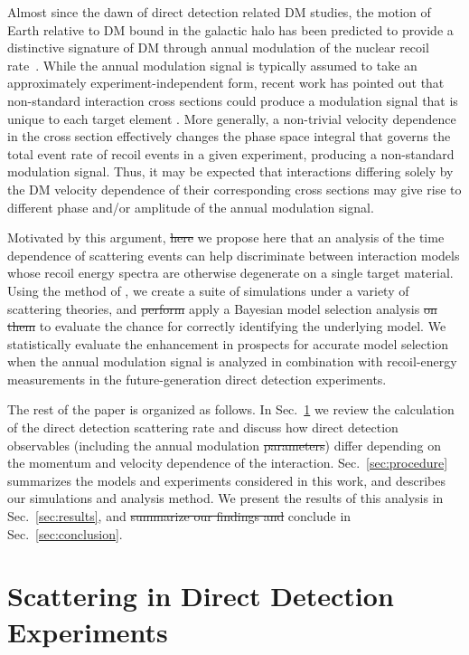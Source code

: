 \documentclass[11pt]{article}
\newcommand{\Sec}[1]{Sec.~\ref{#1}} \newcommand{\Secs}[2]{Secs.~\ref{#1} and \ref{#2}} \newcommand{\Secm}[2]{Secs.~\ref{#1} through \ref{#2}}
\newcommand{\sjwColor}{red}
\newcommand{\sjw}[1]{{\color{\sjwColor} #1}}
\newcommand{\sjwrm}[1]{{\color{\sjwColor}\protect\sout{#1}}}
\begin{document}
Almost since the dawn of direct detection related DM studies, the motion of Earth relative to DM bound in the galactic halo has been predicted to provide a distinctive signature of DM through annual modulation of the nuclear recoil rate~\cite{Freese:1987wu, Freese:2012xd,Lee:2013xxa,Britto:2014wga,DelNobile:2015nua,Kouvaris:2015xga}. While the annual modulation signal is typically assumed to take an approximately experiment-independent form, recent work has pointed out that non-standard interaction cross sections could produce a modulation signal that is unique to each target element \cite{DelNobile:2015tza,DelNobile:2015rmp}. More generally, a non-trivial velocity dependence in the cross section effectively changes the phase space integral that governs the total event rate of recoil events in a given experiment, producing a non-standard modulation signal. Thus, it may be expected that interactions differing solely by the DM velocity dependence of their corresponding cross sections may give rise to different phase and/or amplitude of the annual modulation signal. 

Motivated by this argument, \sjwrm{here} we propose \sjw{here} that \sjw{an} analysis of \sjw{the} time dependence of scattering events can help discriminate between interaction models whose recoil energy spectra are otherwise degenerate on a single target material. Using the method of \cite{Gluscevic:2015sqa}, we create a suite of simulations under a variety of scattering theories, and \sjwrm{perform} \sjw{apply a} Bayesian model selection analysis \sjwrm{on them} to evaluate the chance for correctly identifying the underlying model. We statistically evaluate the enhancement in prospects for accurate model selection when the annual modulation signal is analyzed in combination with recoil-energy measurements in the future-generation direct detection experiments. 

The rest of the paper is organized as follows. In \Sec{sec:dd} we review the calculation of the direct detection scattering rate and discuss how direct detection observables (including the annual modulation \sjwrm{parameters}) differ depending on the momentum and velocity dependence of the interaction. \Sec{sec:procedure} summarizes the models and experiments considered in this work, and describes our simulations and analysis method. We present the results of this analysis in \Sec{sec:results}, and \sjwrm{summarize our findings and} conclude in \Sec{sec:conclusion}.

\section{Scattering in Direct Detection Experiments}\label{sec:dd}
\end{document}
